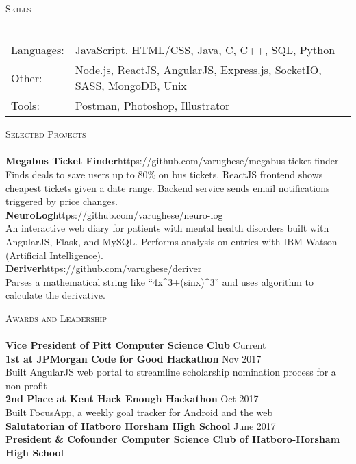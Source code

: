 \documentclass[a4paper]{article}
\newcommand{\lineunder} {
    \vspace*{-8pt} \\
    \hspace*{-18pt} \hrulefill \\
}
\newcommand{\header} [1] {
    {\hspace*{-18pt}\vspace*{6pt} \textsc{#1}}
    \vspace*{-6pt} \lineunder
}
\begin{document}
\header{Skills}
\begin{tabular}{ l l }
	Languages: & JavaScript, HTML/CSS, Java, C, C++, SQL, Python                        \\
	Other:     & Node.js, ReactJS, AngularJS, Express.js, SocketIO, SASS, MongoDB, Unix \\
	Tools:     & Postman, Photoshop, Illustrator                                        \\
\end{tabular}
\vspace{2mm}

\header{Selected Projects}
{\textbf{Megabus Ticket Finder}}\hfill https://github.com/varughese/megabus-ticket-finder\\
Finds deals to save users up to 80\% on bus tickets. ReactJS frontend shows cheapest tickets given a date range. Backend service sends email notifications triggered by price changes.\\
\vspace*{2mm}
{\textbf{NeuroLog}}\hfill https://github.com/varughese/neuro-log\\
An interactive web diary for patients with mental health disorders built with AngularJS, Flask, and MySQL. Performs analysis on entries with IBM Watson (Artificial Intelligence).\\
\vspace*{2mm}
{\textbf{Deriver}}\hfill https://github.com/varughese/deriver\\
Parses a mathematical string like “4x\textasciicircum{}3+(sinx)\textasciicircum{}3” and uses algorithm to calculate the derivative.\\
\vspace*{2mm}

\header{Awards and Leadership}
\textbf{Vice President of Pitt Computer Science Club} \hfill Current\\

\vspace*{2mm}
\textbf{1st at JPMorgan Code for Good Hackathon} \hfill Nov 2017 \\
Built AngularJS web portal to streamline scholarship nomination process for a non-profit \\
\vspace*{2mm}
\textbf{2nd Place at Kent Hack Enough Hackathon}  \hfill Oct 2017 \\
Built FocusApp, a weekly goal tracker for Android and the web \\
\vspace*{2mm}
\textbf{Salutatorian of Hatboro Horsham High School} \hfill June 2017 \\
\vspace*{2mm}
\textbf{President \& Cofounder Computer Science Club of Hatboro-Horsham High School}\\

\vspace*{2mm}

\ 
\end{document}
